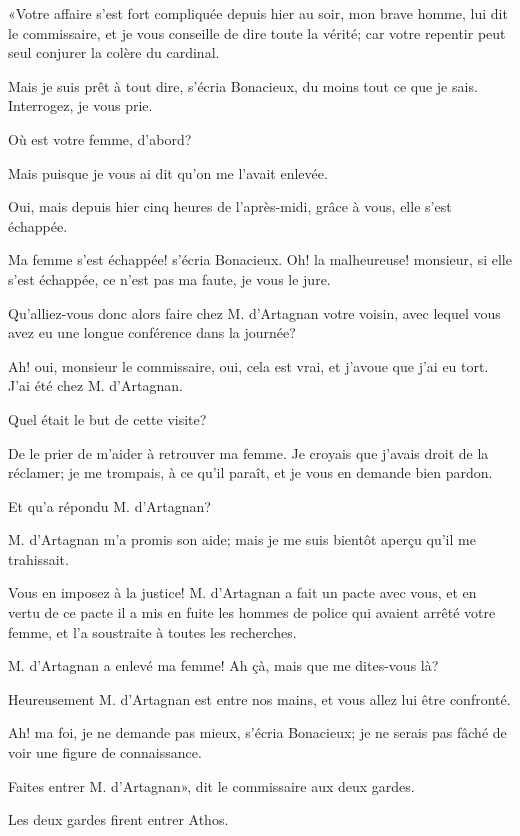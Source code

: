 «Votre affaire s'est fort compliquée depuis hier au soir, mon brave homme, lui dit le commissaire, et je vous conseille de dire toute la vérité; car votre repentir peut seul conjurer la colère du cardinal. 

\speak  Mais je suis prêt à tout dire, s'écria Bonacieux, du moins tout ce que je sais. Interrogez, je vous prie. 

\speak  Où est votre femme, d'abord? 

\speak  Mais puisque je vous ai dit qu'on me l'avait enlevée. 

\speak  Oui, mais depuis hier cinq heures de l'après-midi, grâce à vous, elle s'est échappée. 

\speak  Ma femme s'est échappée! s'écria Bonacieux. Oh! la malheureuse! monsieur, si elle s'est échappée, ce n'est pas ma faute, je vous le jure. 

\speak  Qu'alliez-vous donc alors faire chez M. d'Artagnan votre voisin, avec lequel vous avez eu une longue conférence dans la journée? 

\speak  Ah! oui, monsieur le commissaire, oui, cela est vrai, et j'avoue que j'ai eu tort. J'ai été chez M. d'Artagnan. 

\speak  Quel était le but de cette visite? 

\speak  De le prier de m'aider à retrouver ma femme. Je croyais que j'avais droit de la réclamer; je me trompais, à ce qu'il paraît, et je vous en demande bien pardon. 

\speak  Et qu'a répondu M. d'Artagnan? 

\speak  M. d'Artagnan m'a promis son aide; mais je me suis bientôt aperçu qu'il me trahissait. 

\speak  Vous en imposez à la justice! M. d'Artagnan a fait un pacte avec vous, et en vertu de ce pacte il a mis en fuite les hommes de police qui avaient arrêté votre femme, et l'a soustraite à toutes les recherches. 

\speak  M. d'Artagnan a enlevé ma femme! Ah çà, mais que me dites-vous là? 

\speak  Heureusement M. d'Artagnan est entre nos mains, et vous allez lui être confronté. 

\speak  Ah! ma foi, je ne demande pas mieux, s'écria Bonacieux; je ne serais pas fâché de voir une figure de connaissance. 

\speak  Faites entrer M. d'Artagnan», dit le commissaire aux deux gardes. 

Les deux gardes firent entrer Athos. 

